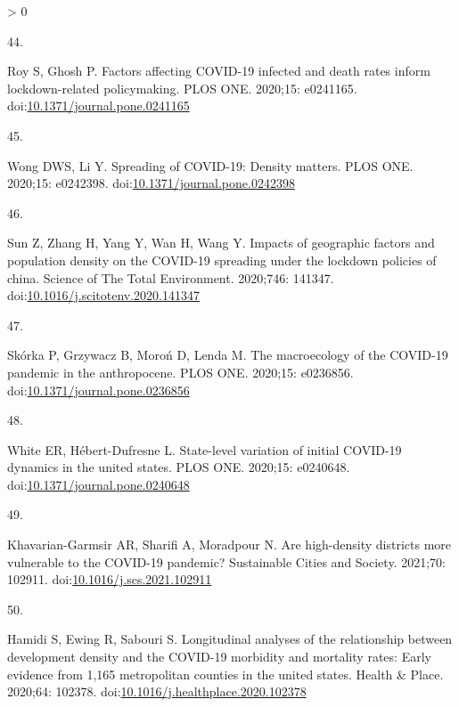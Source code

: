 \documentclass[10pt,letterpaper]{article}
\newlength{\csllabelwidth}
\newlength{\cslhangindent}
\newenvironment{CSLReferences}[3] %
 {%
  \setlength{\parindent}{0pt}
  \ifodd #1 \everypar{\setlength{\hangindent}{\cslhangindent}}\ignorespaces\fi
  \ifnum #2 > 0
  \setlength{\parskip}{#2\baselineskip}
  \fi
 }%
 {}
\newcommand{\CSLLeftMargin}[1]{\parbox[t]{\csllabelwidth}{#1}}
\newcommand{\CSLRightInline}[1]{\parbox[t]{\linewidth - \csllabelwidth}{#1}}
\begin{document}
\begin{CSLReferences}{0}{0}
\leavevmode\hypertarget{ref-Roy2020factors}{}%
\CSLLeftMargin{44. }
\CSLRightInline{Roy S, Ghosh P. Factors affecting COVID-19 infected and
death rates inform lockdown-related policymaking. PLOS ONE. 2020;15:
e0241165.
doi:\href{https://doi.org/10.1371/journal.pone.0241165}{10.1371/journal.pone.0241165}}

\leavevmode\hypertarget{ref-Wong2020spreading}{}%
\CSLLeftMargin{45. }
\CSLRightInline{Wong DWS, Li Y. Spreading of COVID-19: Density matters.
PLOS ONE. 2020;15: e0242398.
doi:\href{https://doi.org/10.1371/journal.pone.0242398}{10.1371/journal.pone.0242398}}

\leavevmode\hypertarget{ref-Sun2020impacts}{}%
\CSLLeftMargin{46. }
\CSLRightInline{Sun Z, Zhang H, Yang Y, Wan H, Wang Y. Impacts of
geographic factors and population density on the COVID-19 spreading
under the lockdown policies of china. Science of The Total Environment.
2020;746: 141347.
doi:\href{https://doi.org/10.1016/j.scitotenv.2020.141347}{10.1016/j.scitotenv.2020.141347}}

\leavevmode\hypertarget{ref-Skorka2020macroecology}{}%
\CSLLeftMargin{47. }
\CSLRightInline{Skórka P, Grzywacz B, Moroń D, Lenda M. The macroecology
of the COVID-19 pandemic in the anthropocene. PLOS ONE. 2020;15:
e0236856.
doi:\href{https://doi.org/10.1371/journal.pone.0236856}{10.1371/journal.pone.0236856}}

\leavevmode\hypertarget{ref-White2020state}{}%
\CSLLeftMargin{48. }
\CSLRightInline{White ER, Hébert-Dufresne L. State-level variation of
initial COVID-19 dynamics in the united states. PLOS ONE. 2020;15:
e0240648.
doi:\href{https://doi.org/10.1371/journal.pone.0240648}{10.1371/journal.pone.0240648}}

\leavevmode\hypertarget{ref-Khavarian2021high}{}%
\CSLLeftMargin{49. }
\CSLRightInline{Khavarian-Garmsir AR, Sharifi A, Moradpour N. Are
high-density districts more vulnerable to the COVID-19 pandemic?
Sustainable Cities and Society. 2021;70: 102911.
doi:\href{https://doi.org/10.1016/j.scs.2021.102911}{10.1016/j.scs.2021.102911}}

\leavevmode\hypertarget{ref-Hamidi2020longitudinal}{}%
\CSLLeftMargin{50. }
\CSLRightInline{Hamidi S, Ewing R, Sabouri S. Longitudinal analyses of
the relationship between development density and the COVID-19 morbidity
and mortality rates: Early evidence from 1,165 metropolitan counties in
the united states. Health \& Place. 2020;64: 102378.
doi:\href{https://doi.org/10.1016/j.healthplace.2020.102378}{10.1016/j.healthplace.2020.102378}}


\end{CSLReferences}
\end{document}

